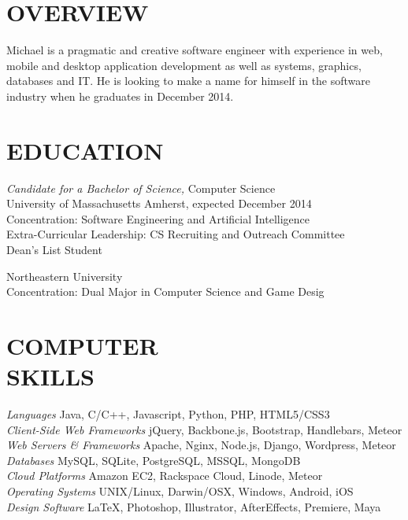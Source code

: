 \documentclass[line,margin]{res}
\begin{document}
\address{169 Brittany Mnr Apt F, Amherst, MA 01002}
\address{(781) 264-6283  --  mike@miketurley.com -- github.com/mturley}

\begin{resume}
 
\section{OVERVIEW}
    Michael is a pragmatic and creative software engineer with experience in web, mobile and desktop application development as well as systems, graphics, databases and IT.  He is looking to make a name for himself in the software industry when he graduates in December 2014.
 
 
\section{EDUCATION}
    {\sl Candidate for a Bachelor of Science,} Computer Science \\
    University of Massachusetts Amherst, 
    expected December 2014 \\
    Concentration: Software Engineering and Artificial Intelligence \\
    Extra-Curricular Leadership: CS Recruiting and Outreach Committee \\
    Dean's List Student

    Northeastern University \\
    Concentration: Dual Major in Computer Science and Game Desig
 
 
\section{COMPUTER \\ SKILLS}
    {\sl Languages} \hfill Java, C/C++, Javascript, Python, PHP, HTML5/CSS3 \\
    {\sl Client-Side Web Frameworks} \hfill jQuery, Backbone.js, Bootstrap, Handlebars, Meteor \\
    {\sl Web Servers \& Frameworks} \hfill Apache, Nginx, Node.js, Django, Wordpress, Meteor \\
    {\sl Databases} \hfill MySQL, SQLite, PostgreSQL, MSSQL, MongoDB \\
    {\sl Cloud Platforms} \hfill Amazon EC2, Rackspace Cloud, Linode, Meteor \\
    {\sl Operating Systems} \hfill UNIX/Linux, Darwin/OSX, Windows, Android, iOS \\
    {\sl Design Software} \hfill \LaTeX, Photoshop, Illustrator, AfterEffects, Premiere, Maya
 

\end{resume}
\end{document}
